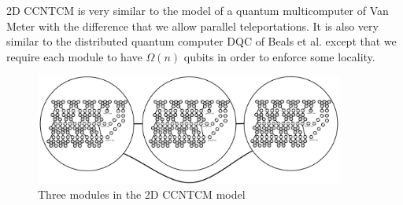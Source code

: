 \textsf{2D CCNTCM} is very similar to the model of a quantum multicomputer
of Van Meter
\cite{VanMeter2006} with the difference that we allow parallel teleportations.
It is also very similar to the distributed quantum computer \textsf{DQC} of
Beals et al. \cite{Beals2012} except that we require each module to have
$\Omega(n)$ qubits in order to enforce some locality.

\begin{figure}[btp!]
\begin{center}
\includegraphics[width=4in]{factor-polylog/figures/modules.pdf}
\end{center}
\caption{Three modules in the \textsf{2D CCNTCM} model}
\label{fig:modules}
\end{figure}

